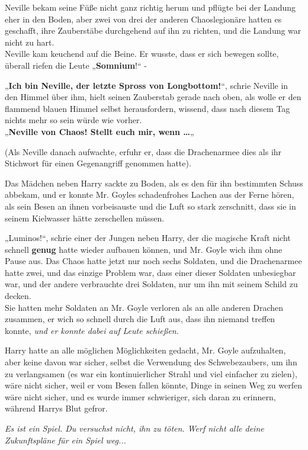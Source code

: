 {Neville bekam seine Füße nicht ganz richtig herum und pflügte bei der Landung eher in den Boden, aber zwei von drei der anderen Chaoslegionäre hatten es geschafft, ihre Zauberstäbe durchgehend auf ihn zu richten, und die Landung war nicht zu hart.\\ Neville kam keuchend auf die Beine. Er wusste, dass er sich bewegen sollte, überall riefen die Leute „\textbf{Somnium}!“ -

„\textbf{Ich bin Neville, der letzte Spross von Longbottom!}“, schrie Neville in den Himmel über ihm, hielt seinen Zauberstab gerade nach oben, als wolle er den flammend blauen Himmel selbst herausfordern, wissend, dass nach diesem Tag nichts mehr so sein würde wie vorher.\\ „\textbf{Neville von Chaos! Stellt euch mir, wenn …}„

(Als Neville danach aufwachte, erfuhr er, dass die Drachenarmee dies als ihr Stichwort für einen Gegenangriff genommen hatte).

Das Mädchen neben Harry sackte zu Boden, als es den für ihn bestimmten Schuss abbekam, und er konnte Mr. Goyles schadenfrohes Lachen aus der Ferne hören, als sein Besen an ihnen vorbeisauste und die Luft so stark zerschnitt, dass sie in seinem Kielwasser hätte zerschellen müssen.

„Luminos!“, schrie einer der Jungen neben Harry, der die magische Kraft nicht schnell \textbf{genug} hatte wieder aufbauen können, und Mr. Goyle wich ihm ohne Pause aus. Das Chaos hatte jetzt nur noch sechs Soldaten, und die Drachenarmee hatte zwei, und das einzige Problem war, dass einer dieser Soldaten unbesiegbar war, und der andere verbrauchte drei Soldaten, nur um ihn mit seinem Schild zu decken.\\ Sie hatten mehr Soldaten an Mr. Goyle verloren als an alle anderen Drachen zusammen, er wich so schnell durch die Luft aus, dass ihn niemand treffen konnte, \emph{und er konnte dabei auf Leute schießen.}

Harry hatte an alle möglichen Möglichkeiten gedacht, Mr. Goyle aufzuhalten, aber keine davon war sicher, selbst die Verwendung des Schwebezaubers, um ihn zu verlangsamen (es war ein kontinuierlicher Strahl und viel einfacher zu zielen), wäre nicht sicher, weil er vom Besen fallen könnte, Dinge in seinen Weg zu werfen wäre nicht sicher, und es wurde immer schwieriger, sich daran zu erinnern, während Harrys Blut gefror.

\emph{Es ist ein Spiel. Du versuchst nicht, ihn zu töten. Werf nicht alle deine Zukunftspläne für ein Spiel weg...}

}
